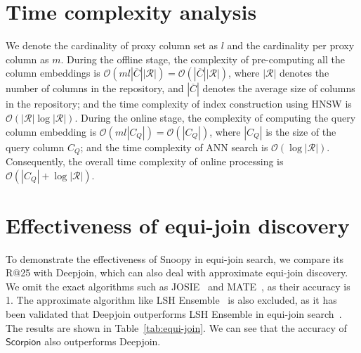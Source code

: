 \appendices

\section{Time complexity analysis}
\label{appendix:A}
We denote the cardinality of proxy column set  as $l$ and the cardinality per proxy column as $m$. During the offline stage, the complexity of pre-computing all the column embeddings is $\mathcal{O}(ml|\overline{C}||\mathcal{R}|) = \mathcal{O}(|\overline{C}||\mathcal{R}|)$, where $|\mathcal{R}|$ denotes the number of columns in the repository, and $|\overline{C}|$ denotes the average size of columns in the repository; and the time complexity of index construction using HNSW is $\mathcal{O}(|\mathcal{R}| \operatorname{log}|\mathcal{R}|)$. During the online stage, the complexity of computing the query column embedding is $\mathcal{O}(ml|C_Q|) = \mathcal{O}(|C_Q|)$, where $|C_Q|$ is the size of the query column $C_Q$; and the time complexity of ANN search is  $\mathcal{O}(\operatorname{log}|\mathcal{R}|)$. 
Consequently, the overall time complexity of online processing is $\mathcal{O}(|C_Q| + \operatorname{log}|\mathcal{R}|)$.



\section{Effectiveness of equi-join discovery}
\label{appendix:B}
To demonstrate the effectiveness of \textsf{Snoopy} in equi-join search, we compare its R@25 with Deepjoin, which can also deal with approximate equi-join discovery.
We omit the exact algorithms such as JOSIE~\cite{JOSIE} and MATE~\cite{MATE}, as their accuracy is 1. The approximate algorithm like LSH Ensemble~\cite{LSH} is also excluded, as it has been validated that Deepjoin outperforms LSH Ensemble in equi-join search~\cite{Deepjoin}. The results are shown in Table~\ref{tab:equi-join}. We can see that the accuracy of $\textsf{Scorpion}$  also outperforms Deepjoin.




